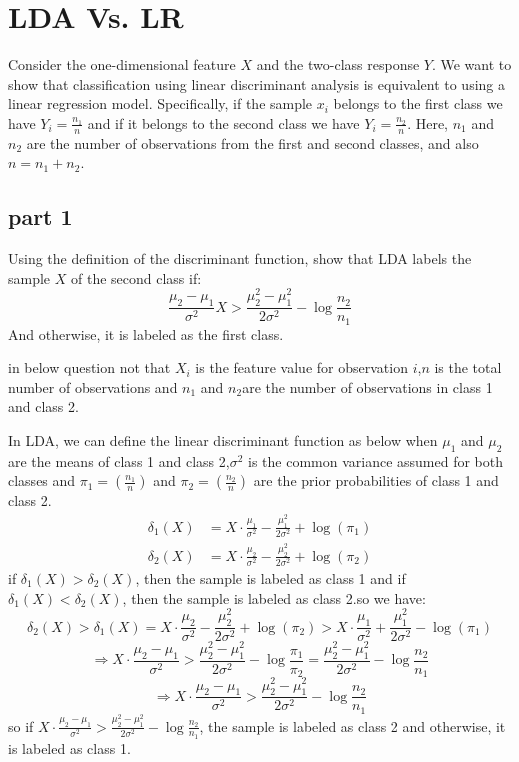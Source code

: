 \section{LDA Vs. LR}

Consider the one-dimensional feature $X$ and the two-class response $Y$. We want to show that classification using linear discriminant analysis is equivalent to using a linear regression model. Specifically, if the sample $x_i$ belongs to the first class we have $Y_i = \frac{n_1}{n}$ and if it belongs to the second class we have $Y_i = \frac{n_2}{n}$. Here, $n_1$ and $n_2$ are the number of observations from the first and second classes, and also $n = n_1 + n_2$.

\subsection{part 1}
Using the definition of the discriminant function, show that LDA labels the sample $X$ of the second class if:
\[
\frac{\mu_2 - \mu_1}{\sigma^2} X > \frac{\mu_2^2 - \mu_1^2}{2\sigma^2} - \log \frac{n_2}{n_1}
\]
And otherwise, it is labeled as the first class.

\begin{qsolve}
	\begin{qsolve}[]
		in below question not that  $X_i$ is the feature value for observation $i$,$n$ is the total number of observations and $n_1$ and $n_2$are the number of observations in class 1 and class 2.
	  
		In LDA, we can define the linear discriminant function as below when $\mu_1$ and $\mu_2$ are the means of class 1 and class 2,$\sigma^2$ is the common variance assumed for both classes and $\pi_1 = \left(\frac{n_1}{n}\right)$ and $\pi_2 = \left(\frac{n_2}{n}\right)$ are the prior probabilities of class 1 and class 2.
		\begin{align*}
			\delta_1(X) &= X \cdot \frac{\mu_1}{\sigma^2} - \frac{\mu_1^2}{2\sigma^2} + \log(\pi_1) \\
			\delta_2(X) &= X \cdot \frac{\mu_2}{\sigma^2} - \frac{\mu_2^2}{2\sigma^2} + \log(\pi_2)
		  \end{align*}
		  if $\delta_1(X) > \delta_2(X)$, then the sample is labeled as class 1 and if $\delta_1(X) < \delta_2(X)$, then the sample is labeled as class 2.so we have:
		  $$ \delta_2(X) > \delta_1(X) = X \cdot \frac{\mu_2}{\sigma^2} - \frac{\mu_2^2}{2\sigma^2} + \log(\pi_2) > X \cdot \frac{\mu_1}{\sigma^2} + \frac{\mu_1^2}{2\sigma^2} - \log(\pi_1) $$
		  $$ \Rightarrow X \cdot \frac{\mu_2 - \mu_1}{\sigma^2} > \frac{\mu_2^2 - \mu_1^2}{2\sigma^2} - \log \frac{\pi_1}{\pi_2} = \frac{\mu_2^2 - \mu_1^2}{2\sigma^2} - \log \frac{n_2}{n_1} $$
		  $$ \Rightarrow X \cdot \frac{\mu_2 - \mu_1}{\sigma^2} > \frac{\mu_2^2 - \mu_1^2}{2\sigma^2} - \log \frac{n_2}{n_1} $$
		  so if $X \cdot \frac{\mu_2 - \mu_1}{\sigma^2} > \frac{\mu_2^2 - \mu_1^2}{2\sigma^2} - \log \frac{n_2}{n_1}$, the sample is labeled as class 2 and otherwise, it is labeled as class 1.
		\end{qsolve}
\end{qsolve}


